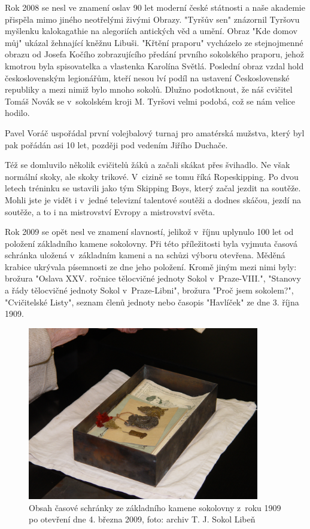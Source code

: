 \documentclass[a5paper, 11pt, twoside]{article}
\begin{document}
Rok 2008 se nesl ve znamení oslav 90 let moderní české státnosti a naše
akademie přispěla mimo jiného neotřelými živými Obrazy. "Tyršův sen"
znázornil Tyršovu myšlenku kalokagathie na alegoriích antických věd a
umění. Obraz "Kde domov můj" ukázal žehnající kněžnu Libuši. "Křtění
praporu" vycházelo ze stejnojmenné obrazu od Josefa Kočího
zobrazujícího předání prvního sokolského praporu, jehož kmotrou byla
spisovatelka a vlastenka Karolína Světlá. Poslední obraz vzdal hold
československým legionářům, kteří nesou lví podíl na ustavení
Československé republiky a mezi nimiž bylo mnoho sokolů. Dlužno
podotknout, že náš cvičitel Tomáš Novák se v~sokolském kroji M. Tyršovi
velmi podobá, což se nám velice hodilo.

Pavel Voráč uspořádal první volejbalový turnaj pro amatérská mužstva,
který byl pak pořádán asi 10 let, později pod vedením Jiřího Duchače.

Též se domluvilo několik cvičitelů žáků a začali skákat přes švihadlo.
Ne však normální skoky, ale skoky trikové. V~cizině se tomu říká
Ropeskipping. Po dvou letech tréninku se ustavili jako tým Skipping
Boys, který začal jezdit na soutěže. Mohli jste je vidět i v~jedné
televizní talentové soutěži a dodnes skáčou, jezdí na soutěže, a to i na
mistrovství Evropy a mistrovství světa.

Rok 2009 se opět nesl ve znamení slavností, jelikož v~říjnu uplynulo 100
let od položení základního kamene sokolovny. Při této příležitosti byla
vyjmuta časová schránka uložená v~základním kameni a na schůzi výboru
otevřena. Měděná krabice ukrývala písemnosti ze dne jeho položení. Kromě
jiným mezi nimi byly: brožura "Oslava XXV. ročnice tělocvičné jednoty
Sokol v~Praze-VIII.", "Stanovy a řády tělocvičné jednoty Sokol
v~Praze-Libni", brožura "Proč jsem sokolem?", "Cvičitelské Listy",
seznam členů jednoty nebo časopis "Havlíček" ze dne 3. října 1909.

\begin{figure}[h]
  \centering 
  \includegraphics[width=0.9\textwidth]{img/58_schranka.JPG}
  \caption*{Obsah časové schránky ze základního kamene sokolovny z~roku 1909
  po otevření dne 4. března 2009, foto: archiv T. J. Sokol Libeň}
\end{figure}
\end{document}
